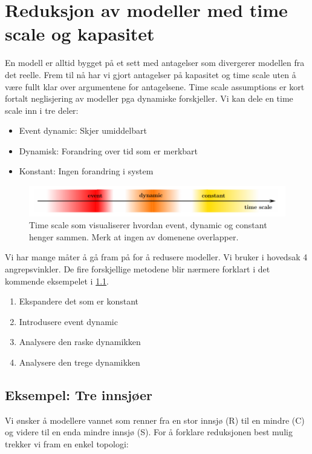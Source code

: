 \clearpage
\section{Reduksjon av modeller med time scale og kapasitet}\label{sec:timescale}
En modell er alltid bygget på et sett med antagelser som divergerer modellen fra det reelle. Frem til nå har vi gjort antagelser på kapasitet og time scale uten å være fullt klar over argumentene for antagelsene. Time scale assumptions er kort fortalt neglisjering av modeller pga dynamiske forskjeller. Vi kan dele en time scale inn i tre deler:


\begin{itemize}
    \item Event dynamic: Skjer  umiddelbart
    \item Dynamisk: Forandring over tid som er merkbart
    \item Konstant: Ingen forandring i system
\end{itemize}

\begin{figure}[H]
    \centering
    \includegraphics[scale=0.5]{Figures/time_scale}
    \caption{Time scale som visualiserer hvordan event, dynamic og constant henger sammen. Merk at ingen av domenene overlapper.}
    \label{fig:time_scale}
\end{figure}


Vi har mange måter å gå fram på for å redusere modeller. Vi bruker i hovedsak 4 angrepsvinkler. De fire forskjellige metodene blir nærmere forklart i det kommende eksempelet i \cref{sec:tre_sjo}. 
\begin{enumerate}
    \label{lst:reduction}
    \item Ekspandere det som er konstant
    \item Introdusere event dynamic
    \item Analysere den raske dynamikken
    \item Analysere den trege dynamikken
\end{enumerate}

\subsection{Eksempel: Tre innsjøer}\label{sec:tre_sjo}
Vi ønsker å modellere vannet som renner fra en stor innsjø (R) til en mindre (C) og videre til en enda mindre innsjø (S). For å forklare reduksjonen best mulig trekker vi fram en enkel topologi:


